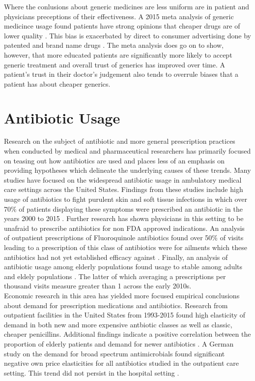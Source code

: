\indent Where the conlusions about generic medicines are less uniform are in patient and physicians preceptions of their effectiveness. A 2015 meta analysis of generic medicince usage found patients have strong opinions that cheaper drugs are of lower quality \cite{dunne_what_2015}. This bias is exacerbated by direct to consumer advertising done by patented and brand name drugs \cite{morgan_economics_2003}. The meta analysis does go on to show, however, that more educated patients are significantly more likely to accept generic treatment and overall trust of generics has improved over time. A patient's trust in their doctor's judgement also tends to overrule biases that a patient has about cheaper generics.

\section{Antibiotic Usage}
Research on the subject of antibiotic and more general prescription practices when conducted by medical and pharmaceutical researchers has primarily focused on teasing out how antibiotics are used and places less of an emphasis on providing hypotheses which delineate the underlying causes of these trends. Many studies have focused on the widespread antibiotic usage in ambulatory medical care settings across the United States. Findings from these studies include high usage of antibiotics to fight purulent skin and soft tissue infections in which over 70\% of patients displaying these symptoms were prescribed an antibiotic in the years 2000 to 2015 \cite{fritz_national_2020}. Further research has shown physicians in this setting to be unafraid to prescribe antibiotics for non FDA approved indications. An analysis of outpatient prescriptions of Fluoroquinole antibiotics found over 50\% of visits leading to a prescription of this class of antibiotics were for ailments which these antibiotics had not yet established efficacy against \cite{almalki_off-label_2016}. Finally, an analysis of antibiotic usage among elderly populations found usage to stable among adults \cite{roumie_trends_2005} and eldely populations \cite{kabbani_outpatient_2018}. The latter of which averaging a prescriptions per thousand visits measure greater than 1 across the early 2010s.\\
\indent Economic research in this area has yielded more focused empirical conclusions about demand for prescription medications and antibiotics. Research from outpatient facilities in the United States from 1993-2015 found high elasticity of demand in both new and more expensive antbiotic classes as well as classic, cheaper penicillins. Additional findings indicate a positive correlation between the proportion of elderly patients and demand for newer antibiotics \cite{kianmehr_system_2020}. A German study on the demand for broad spectrum antimicrobials found significant negative own price elasticities for all antibiotics studied in the outpatient care setting. This trend did not persist in the hospital setting \cite{kaier_impact_2013}.\\

